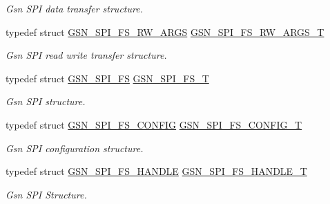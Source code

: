 \begin{DoxyCompactItemize}
\begin{DoxyCompactList}\small\item\em Gsn SPI data transfer structure. \end{DoxyCompactList}\item 
typedef struct \hyperlink{a00235}{GSN\_\-SPI\_\-FS\_\-RW\_\-ARGS} \hyperlink{a00655_gaafeeec883c4d267e64fb48904915cc43}{GSN\_\-SPI\_\-FS\_\-RW\_\-ARGS\_\-T}
\begin{DoxyCompactList}\small\item\em Gsn SPI read write transfer structure. \end{DoxyCompactList}\item 
typedef struct \hyperlink{a00232}{GSN\_\-SPI\_\-FS} \hyperlink{a00655_gac18ad73594795ef9c6caa997e3b92549}{GSN\_\-SPI\_\-FS\_\-T}
\begin{DoxyCompactList}\small\item\em Gsn SPI structure. \end{DoxyCompactList}\item 
typedef struct \hyperlink{a00233}{GSN\_\-SPI\_\-FS\_\-CONFIG} \hyperlink{a00655_ga9f1e06e0752e4d0b2310b69b46111df9}{GSN\_\-SPI\_\-FS\_\-CONFIG\_\-T}
\begin{DoxyCompactList}\small\item\em Gsn SPI configuration structure. \end{DoxyCompactList}\item 
typedef struct \hyperlink{a00234}{GSN\_\-SPI\_\-FS\_\-HANDLE} \hyperlink{a00655_ga306453bdfa5ffae1498080168f2ee555}{GSN\_\-SPI\_\-FS\_\-HANDLE\_\-T}
\begin{DoxyCompactList}\small\item\em Gsn SPI Structure. \end{DoxyCompactList}\end{DoxyCompactItemize}
